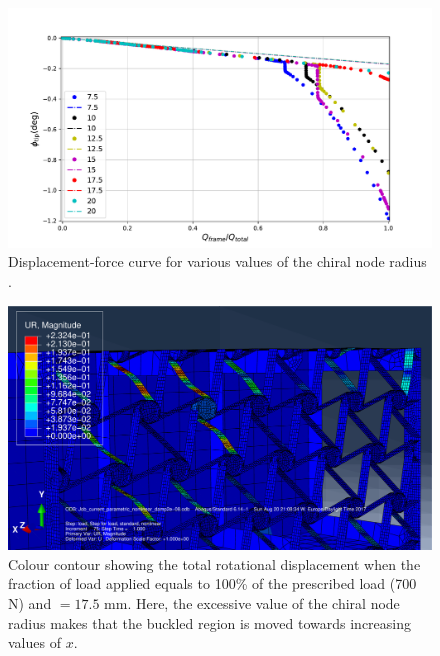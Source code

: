       \begin{figure}[!htpb] %
        \centering
        \includegraphics[width=0.8 \textwidth]{figures/result-sim/r/force_displacement-far}
        \caption[Displacement-force curve for various values of the chiral node radius]{Displacement-force curve for various values of the chiral node radius \chir.}\label{fig:forceDisplacement-far-r}
      \end{figure}

      \begin{figure}[!htpb] %
        \centering
        \includegraphics[width=0.8 \textwidth]{figures/result-sim/r/17coma5-UR}
        \caption[Colour contour showing the total rotational displacement when the fraction of load applied equals to 100\% of the prescribed load (700 N) and \chir$ = 17.5$ mm]{Colour contour showing the total rotational displacement when the fraction of load applied equals to 100\% of the prescribed load (700 N) and \chir$ = 17.5$ mm. Here, the excessive value of the chiral node radius \chir makes that the buckled region is moved towards increasing values of $x$.}\label{fig:r17coma5-UR}
      \end{figure}

